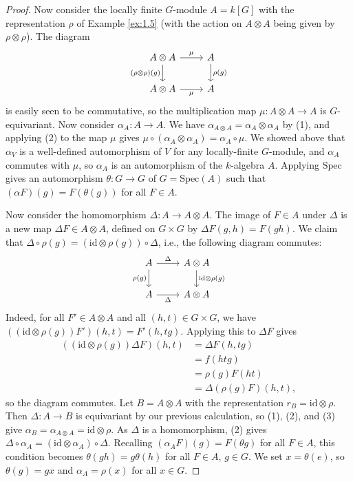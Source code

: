 \documentclass[10pt]{amsart}
\numberwithin{equation}{section}
\newcommand{\Spec}{\mathrm{Spec}}
\newcommand{\id}{\mathrm{id}}
\theoremstyle{plain}
\theoremstyle{definition}
\theoremstyle{remark}
\begin{document}
\begin{proof}
Now consider the locally finite $G$-module $A = k[G]$ with the representation $\rho$ of Example \ref{ex:1.5} (with the action on $A \otimes A$ being given by $\rho \otimes \rho$). The diagram
\[\begin{tikzcd}
    {A \otimes A} & A \\
    {A \otimes A} & A
    \arrow["\mu", from=1-1, to=1-2]
    \arrow["{(\rho \otimes\rho)(g)}"', from=1-1, to=2-1]
    \arrow["{\rho(g)}", from=1-2, to=2-2]
    \arrow["\mu"', from=2-1, to=2-2]
\end{tikzcd}\]
is easily seen to be commutative, so the multiplication map $\mu: A \otimes A \to A$ is $G$-equivariant. Now consider $\alpha_A: A \to A$. We have $\alpha_{A \otimes A} = \alpha_A \otimes \alpha_A$ by (1), and applying (2) to the map $\mu$ gives $\mu \circ (\alpha_A \otimes \alpha_A) = \alpha_A \circ \mu$. We showed above that $\alpha_V$ is a well-defined automorphism of $V$ for any locally-finite $G$-module, and $\alpha_A$ commutes with $\mu$, so $\alpha_A$ is an automorphism of the $k$-algebra $A$. Applying $\Spec$ gives an automorphism $\theta: G \to G$ of $G = \Spec(A)$ such that $(\alpha F)(g) = F(\theta(g))$ for all $F \in A$.

Now consider the homomorphism $\Delta: A \to A \otimes A$. The image of $F \in A$ under $\Delta$ is a new map $\Delta F \in A \otimes A$, defined on $G \times G$ by $\Delta F(g, h) = F(gh)$. We claim that $\Delta \circ \rho(g) = \left(\id \otimes \rho(g)\right) \circ \Delta$, i.e., the following diagram commutes:
\[\begin{tikzcd}
    A & {A \otimes A} \\
    A & {A \otimes A}
    \arrow["\Delta", from=1-1, to=1-2]
    \arrow["{\rho(g)}"', from=1-1, to=2-1]
    \arrow["{\id \otimes \rho(g)}", from=1-2, to=2-2]
    \arrow["\Delta"', from=2-1, to=2-2]
\end{tikzcd}\]
Indeed, for all $F' \in A \otimes A$ and all $(h, t) \in G \times G$, we have $((\id \otimes \rho(g))F')(h,t) = F'(h, tg)$. Applying this to $\Delta F$ gives
\begin{align*}
   ((\id \otimes \rho(g))\Delta F)(h,t) &= \Delta F(h, tg) \\ 
                                        &= f(htg) \\ 
                                        &= \rho(g) F(ht) \\ 
                                        &= \Delta(\rho(g)F)(h,t),
\end{align*}
so the diagram commutes. Let $B = A \otimes A$ with the representation $r_B = \id \otimes \rho$. Then $\Delta: A \to B$ is equivariant by our previous calculation, so (1), (2), and (3) give $\alpha_B = \alpha_{A \otimes A} = \id \otimes \rho$. As $\Delta$ is a homomorphism, (2) gives $\Delta \circ \alpha_A = \left(\id \otimes \alpha_A\right) \circ \Delta$. Recalling $(\alpha_A F)(g) = F(\theta g)$ for all $F \in A$, this condition becomes $\theta(gh) = g \theta(h)$ for all $F \in A$, $g \in G$. We set $x = \theta(e)$, so $\theta(g) = gx$ and $\alpha_A = \rho(x)$ for all $x \in G$.


\end{proof}
\end{document}
